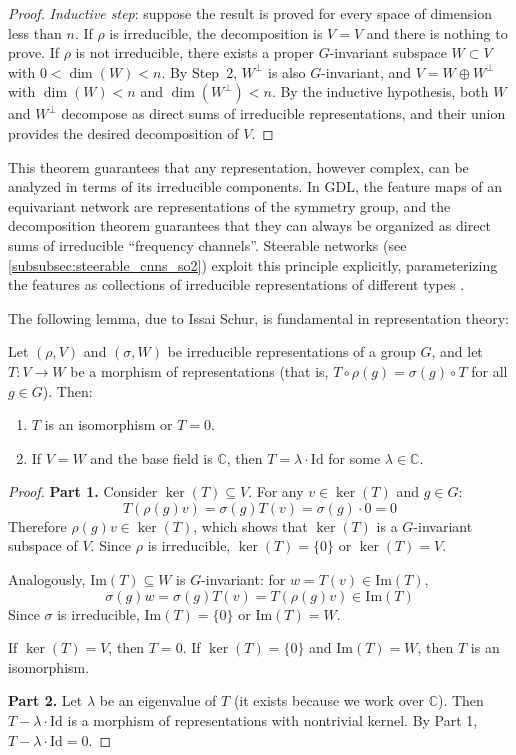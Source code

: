 \begin{proof}
\textit{Inductive step}: suppose the result is proved for every space of dimension less than $n$. If $\rho$ is irreducible, the decomposition is $V = V$ and there is nothing to prove. If $\rho$ is not irreducible, there exists a proper $G$-invariant subspace $W \subset V$ with $0 < \dim(W) < n$. By Step~2, $W^\perp$ is also $G$-invariant, and $V = W \oplus W^\perp$ with $\dim(W) < n$ and $\dim(W^\perp) < n$. By the inductive hypothesis, both $W$ and $W^\perp$ decompose as direct sums of irreducible representations, and their union provides the desired decomposition of $V$.
\end{proof}

This theorem guarantees that any representation, however complex, can be analyzed in terms of its irreducible components. In \gls{GDL}, the feature maps of an equivariant network are representations of the symmetry group, and the decomposition theorem guarantees that they can always be organized as direct sums of irreducible ``frequency channels''. Steerable networks (see \autoref{subsubsec:steerable_cnns_so2}) exploit this principle explicitly, parameterizing the features as collections of irreducible representations of different types \citep{weiler2018learningsteerable, cohen2016steerablecnns}.

The following lemma, due to Issai Schur, is fundamental in representation theory:

\begin{lemma}[Schur]\label{lem:schur}
Let $(\rho, V)$ and $(\sigma, W)$ be irreducible representations of a group $G$, and let $T: V \to W$ be a morphism of representations (that is, $T \circ \rho(g) = \sigma(g) \circ T$ for all $g \in G$). Then:
\begin{enumerate}
    \item $T$ is an isomorphism or $T = 0$.
    \item If $V = W$ and the base field is $\mathbb{C}$, then $T = \lambda \cdot \mathrm{Id}$ for some $\lambda \in \mathbb{C}$.
\end{enumerate}
\end{lemma}

\begin{proof}
\textbf{Part 1.} Consider $\ker(T) \subseteq V$. For any $v \in \ker(T)$ and $g \in G$:
\[
T(\rho(g)v) = \sigma(g)T(v) = \sigma(g) \cdot 0 = 0
\]
Therefore $\rho(g)v \in \ker(T)$, which shows that $\ker(T)$ is a $G$-invariant subspace of $V$. Since $\rho$ is irreducible, $\ker(T) = \{0\}$ or $\ker(T) = V$.

Analogously, $\mathrm{Im}(T) \subseteq W$ is $G$-invariant: for $w = T(v) \in \mathrm{Im}(T)$,
\[
\sigma(g)w = \sigma(g)T(v) = T(\rho(g)v) \in \mathrm{Im}(T)
\]
Since $\sigma$ is irreducible, $\mathrm{Im}(T) = \{0\}$ or $\mathrm{Im}(T) = W$.

If $\ker(T) = V$, then $T = 0$. If $\ker(T) = \{0\}$ and $\mathrm{Im}(T) = W$, then $T$ is an isomorphism.

\textbf{Part 2.} Let $\lambda$ be an eigenvalue of $T$ (it exists because we work over $\mathbb{C}$). Then $T - \lambda \cdot \mathrm{Id}$ is a morphism of representations with nontrivial kernel. By Part 1, $T - \lambda \cdot \mathrm{Id} = 0$.
\end{proof}

